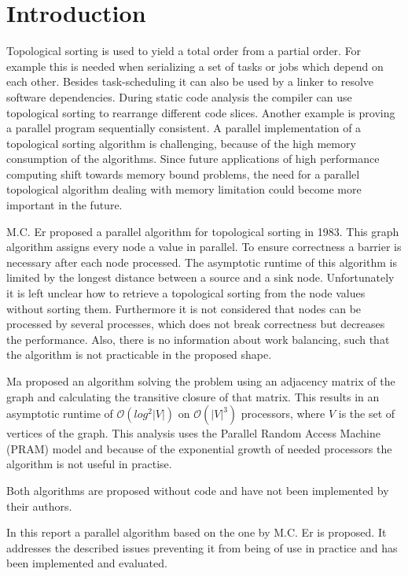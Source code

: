 \section{Introduction}\label{sec:intro}

Topological sorting is used to yield a total order from a partial order. For example this is needed when serializing a set of tasks or jobs which depend on each other. Besides task-scheduling it can also be used by a linker to resolve software dependencies. During static code analysis the compiler can use topological sorting to rearrange different code slices. Another example is proving a parallel program sequentially consistent. A parallel implementation of a topological sorting algorithm is challenging, because of the high memory consumption of the algorithms. Since future applications of high performance computing shift towards memory bound problems, the need for a parallel topological algorithm dealing with memory limitation could become more important in the future.

M.C. Er \cite{er1983parallel} proposed a parallel algorithm for topological sorting in 1983. This graph algorithm assigns every node a value in parallel. To ensure correctness a barrier is necessary after each node processed. The asymptotic runtime of this algorithm is limited by the longest distance between a source and a sink node. Unfortunately it is left unclear how to retrieve a topological sorting from the node values without sorting them. Furthermore it is not considered that nodes can be processed by several processes, which does not break correctness but decreases the performance. Also, there is no information about work balancing, such that the algorithm is not practicable in the proposed shape.

Ma \cite{ma1997efficient} proposed an algorithm solving the problem using an adjacency matrix of the graph and calculating the transitive closure of that matrix. This results in an asymptotic runtime  of $\mathcal{O}(log^2 |V|)$ on $\mathcal{O}(|V|^3)$ processors, where $V$ is the set of vertices of the graph. This analysis uses the Parallel Random Access Machine (PRAM) model and because of the exponential growth of needed processors the algorithm is not useful in practise.

Both algorithms are proposed without code and have not been implemented by their authors.

In this report a parallel algorithm based on the one by M.C. Er is proposed. It addresses the described issues preventing it from being of use in practice and has been implemented and evaluated.


